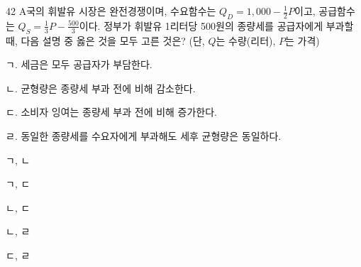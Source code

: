 \begin{question}{42}
A국의 휘발유 시장은 완전경쟁이며, 수요함수는 $Q_{D}=1,000-\frac{1}{2}P$이고, 공급함수는 $Q_{S}=\frac{1}{3}P-\frac{500}{3}$이다. 정부가 휘발유 1리터당 500원의 종량세를 공급자에게 부과할 때, 다음 설명 중 옳은 것을 모두 고른 것은? (단, $Q$는 수량(리터), $P$는 가격)
\begin{framedtext}
ㄱ. 세금은 모두 공급자가 부담한다. \par
ㄴ. 균형량은 종량세 부과 전에 비해 감소한다. \par
ㄷ. 소비자 잉여는 종량세 부과 전에 비해 증가한다. \par
ㄹ. 동일한 종량세를 수요자에게 부과해도 세후 균형량은 동일하다. \par
\end{framedtext}
\begin{choices}
  \item ㄱ, ㄴ
  \item ㄱ, ㄷ
  \item ㄴ, ㄷ
  \item ㄴ, ㄹ
  \item ㄷ, ㄹ
\end{choices}
\end{question}
